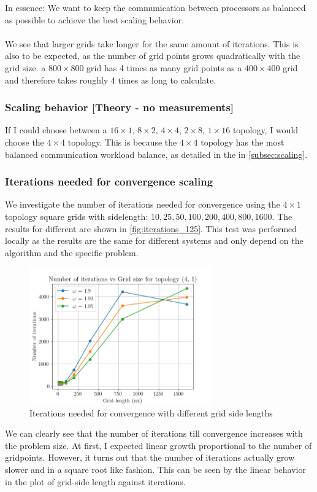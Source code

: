 In essence: We want to keep the communication between processors as balanced as possible to achieve the best scaling behavior.\\

\\
We see that larger grids take longer for the same amount of iterations. This is also to be expected, as the number of grid points grows quadratically with the grid size. a $800 \times 800$ grid has 4 times as many grid points as a $400 \times 400$ grid and therefore takes roughly 4 times as long to calculate. 


\subsubsection{Scaling behavior [Theory - no measurements]}
If I could choose between a $16 \times 1$, $8 \times 2$, $4 \times4$, $2 \times 8$, $1 \times 16$ topology, I would choose the $4 \times 4$ topology. This is because the $4 \times 4$ topology has the most balanced communication workload balance, as detailed in the  in \autoref{subsec:scaling}.

\subsubsection{Iterations needed for convergence scaling}
We investigate the number of iterations needed for convergence using the $4 \times 1$ topology square grids with sidelength: $10, 25, 50, 100, 200, 400, 800, 1600$. The results for different \Shining{$\omega$} are shown in \autoref{fig:iterations_125}. This test was performed locally as the results are the same for different systems and only depend on the algorithm and the specific problem.

\begin{figure}[H]
    \centering
    \includegraphics[width=0.7\textwidth]{../fig/lab1/iteration_count_(4, 1)_125.png}
    \caption{Iterations needed for convergence with different grid side lengths}
    \label{fig:iterations_125}
\end{figure}
We can clearly see that the number of iterations till convergence increases with the problem size. At first, I expected linear growth proportional to the number of gridpoints. However, it turns out that the number of iterations actually grow slower and in a square root like fashion. This can be seen by the linear behavior in the plot of grid-side length against iterations. 


